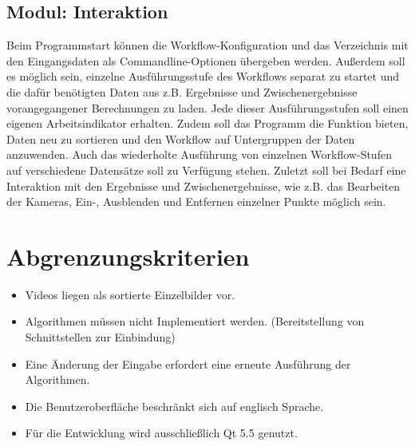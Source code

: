 \subsection{Modul: Interaktion}
Beim Programmstart können die Workflow-Konfiguration und das Verzeichnis mit den Eingangsdaten als Commandline-Optionen übergeben werden. Außerdem soll es möglich sein, einzelne Ausführungsstufe des Workflows separat zu startet und die dafür benötigten Daten aus z.B. Ergebnisse und Zwischenergebnisse vorangegangener Berechnungen zu laden. Jede dieser Ausführungsstufen soll einen eigenen Arbeitsindikator erhalten. Zudem soll das Programm die Funktion bieten, Daten neu zu sortieren und den Workflow auf Untergruppen der Daten anzuwenden. Auch das wiederholte Ausführung von einzelnen Workflow-Stufen auf verschiedene Datensätze soll zu Verfügung stehen. Zuletzt soll bei Bedarf eine Interaktion mit den Ergebnisse und Zwischenergebnisse, wie z.B. das Bearbeiten der Kameras, Ein-, Ausblenden und Entfernen einzelner Punkte möglich sein.

\section{Abgrenzungskriterien}
\begin{itemize}
	\item Videos liegen als sortierte Einzelbilder vor.
	\item Algorithmen müssen nicht Implementiert werden. (Bereitstellung von Schnittstellen zur Einbindung)
	\item Eine Änderung der Eingabe erfordert eine erneute Ausführung der Algorithmen.
	\item Die Benutzeroberfläche beschränkt sich auf englisch Sprache.
	\item Für die Entwicklung wird ausschließlich Qt 5.5 genutzt.
\end{itemize}

